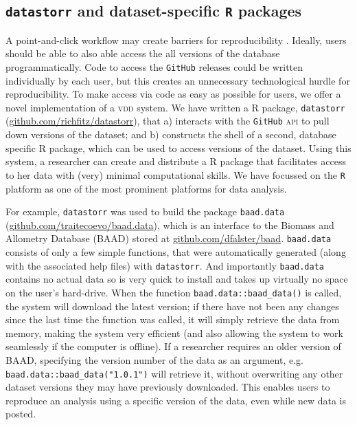 \documentclass[a4paper,11pt]{article}
\newcommand{\smurl}[1]{{\footnotesize\url{#1}}}
\begin{document}
\subsection{\texttt{datastorr} and dataset-specific \texttt{R} packages}

A point-and-click workflow may create barriers for reproducibility \cite{Wilson-2014,Lowndes-2017}. Ideally, users should be able to also able access the all versions of the database programmatically. Code to access the \texttt{GitHub} releases could be written individually by each user, but this creates an unnecessary technological hurdle for reproducibility.  To make access via code as easy as possible for users, we offer a novel implementation of a \textsc{vdd} system. We have written a \textsc{R} package, \texttt{datastorr} (\smurl{github.com/richfitz/datastorr}), that a) interacts with the \texttt{GitHub} \textsc{api} to pull down versions of the dataset; and b) constructs the shell of a second, database specific \textsc{R} package, which can be used to access versions of the dataset. Using this system, a researcher can create and distribute a \textsc{R} package that facilitates access to her data with (very) minimal computational skills. We have focussed on the \texttt{R} platform \cite{R-2017} as one of the most prominent platforms for data analysis.

For example, \texttt{datastorr} was used to build the package \texttt{baad.data} (\smurl{github.com/traitecoevo/baad.data}), which is an interface to the Biomass and Allometry Database (\textsc{BAAD}) \cite{Falster-2015} stored at \smurl{github.com/dfalster/baad}. \texttt{baad.data} consists of only a few simple functions, that were automatically generated (along with the associated help files) with \texttt{datastorr}. And importantly \texttt{baad.data} contains no actual data so is very quick to install and takes up virtually no space on the user's hard-drive. When the function \texttt{baad.data::baad\_data()} is called, the system will download the latest version; if there have not been any changes since the last time the function was called, it will simply retrieve the data from memory, making the system very efficient (and also allowing the system to work seamlessly if the computer is offline). If a researcher requires an older version of \textsc{BAAD}, specifying the version number of the data as an argument, e.g. \texttt{baad.data::baad\_data("1.0.1")} will retrieve it, without overwriting any other dataset versions they may have previously downloaded. This enables users to reproduce an analysis using a specific version of the data, even while new data is posted.
\end{document}

